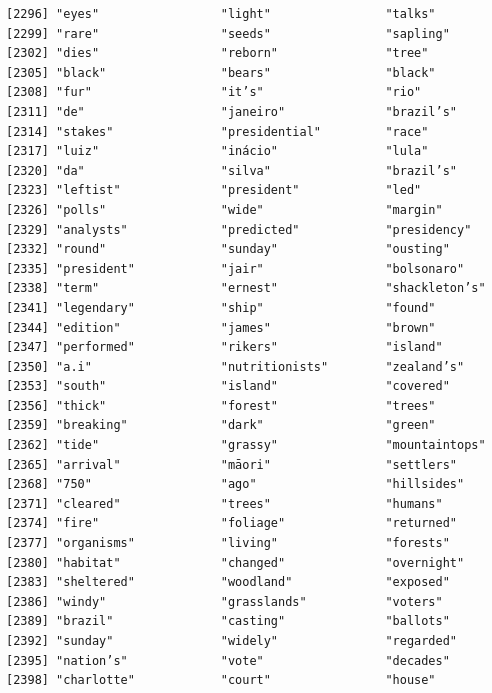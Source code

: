 \documentclass[
  letterpaper,
  DIV=11,
  numbers=noendperiod]{scrartcl}
\begin{document}
\begin{verbatim}
[2296] "eyes"                 "light"                "talks"               
[2299] "rare"                 "seeds"                "sapling"             
[2302] "dies"                 "reborn"               "tree"                
[2305] "black"                "bears"                "black"               
[2308] "fur"                  "it’s"                 "rio"                 
[2311] "de"                   "janeiro"              "brazil’s"            
[2314] "stakes"               "presidential"         "race"                
[2317] "luiz"                 "inácio"               "lula"                
[2320] "da"                   "silva"                "brazil’s"            
[2323] "leftist"              "president"            "led"                 
[2326] "polls"                "wide"                 "margin"              
[2329] "analysts"             "predicted"            "presidency"          
[2332] "round"                "sunday"               "ousting"             
[2335] "president"            "jair"                 "bolsonaro"           
[2338] "term"                 "ernest"               "shackleton’s"        
[2341] "legendary"            "ship"                 "found"               
[2344] "edition"              "james"                "brown"               
[2347] "performed"            "rikers"               "island"              
[2350] "a.i"                  "nutritionists"        "zealand’s"           
[2353] "south"                "island"               "covered"             
[2356] "thick"                "forest"               "trees"               
[2359] "breaking"             "dark"                 "green"               
[2362] "tide"                 "grassy"               "mountaintops"        
[2365] "arrival"              "māori"                "settlers"            
[2368] "750"                  "ago"                  "hillsides"           
[2371] "cleared"              "trees"                "humans"              
[2374] "fire"                 "foliage"              "returned"            
[2377] "organisms"            "living"               "forests"             
[2380] "habitat"              "changed"              "overnight"           
[2383] "sheltered"            "woodland"             "exposed"             
[2386] "windy"                "grasslands"           "voters"              
[2389] "brazil"               "casting"              "ballots"             
[2392] "sunday"               "widely"               "regarded"            
[2395] "nation’s"             "vote"                 "decades"             
[2398] "charlotte"            "court"                "house"               

\end{verbatim}
\end{document}
